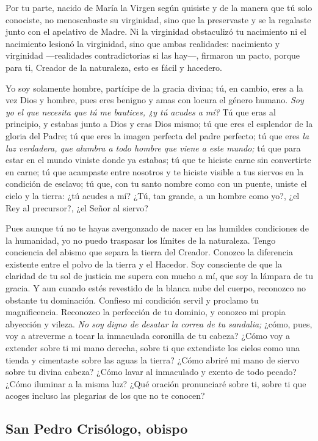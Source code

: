 \begin{body}
\begin{body}
{Por tu parte, nacido de María la Virgen según quisiste y de la manera que tú solo conociste, no menoscabaste su virginidad, sino que la preservaste y se la regalaste junto con el apelativo de Madre. Ni la virginidad obstaculizó tu nacimiento ni el nacimiento lesionó la virginidad, sino que ambas realidades: nacimiento y virginidad ---realidades contradictorias si las hay---, firmaron un pacto, porque para ti, Creador de la naturaleza, esto es fácil y hacedero.

Yo soy solamente hombre, partícipe de la gracia divina; tú, en cambio, eres a la vez Dios y hombre, pues eres benigno y amas con locura el género humano. \emph{Soy yo el que necesita que tú me bautices, ¿y tú acudes a mí?} Tú que eras al principio, y estabas junto a Dios y eras Dios mismo; tú que eres el esplendor de la gloria del Padre; tú que eres la imagen perfecta del padre perfecto; tú que eres \emph{la luz verdadera, que alumbra a todo hombre que viene a este mundo;} tú que para estar en el mundo viniste donde ya estabas; tú que te hiciste carne sin convertirte en carne; tú que acampaste entre nosotros y te hiciste visible a tus siervos en la condición de esclavo; tú que, con tu santo nombre como con un puente, uniste el cielo y la tierra: ¿tú acudes a mí? ¿Tú, tan grande, a un hombre como yo?, ¿el Rey al precursor?, ¿el Señor al siervo?

Pues aunque tú no te hayas avergonzado de nacer en las humildes condiciones de la humanidad, yo no puedo traspasar los límites de la naturaleza. Tengo conciencia del abismo que separa la tierra del Creador. Conozco la diferencia existente entre el polvo de la tierra y el Hacedor. Soy consciente de que la claridad de tu sol de justicia me supera con mucho a mí, que soy la lámpara de tu gracia. Y aun cuando estés revestido de la blanca nube del cuerpo, reconozco no obstante tu dominación. Confieso mi condición servil y proclamo tu magnificencia. Reconozco la perfección de tu dominio, y conozco mi propia abyección y vileza. \emph{No soy digno de desatar la correa de tu sandalia;} ¿cómo, pues, voy a atreverme a tocar la inmaculada coronilla de tu cabeza? ¿Cómo voy a extender sobre ti mi mano derecha, sobre ti que extendiste los cielos como una tienda y cimentaste sobre las aguas la tierra? ¿Cómo abriré mi mano de siervo sobre tu divina cabeza? ¿Cómo lavar al inmaculado y exento de todo pecado? ¿Cómo iluminar a la misma luz? ¿Qué oración pronunciaré sobre ti, sobre ti que acoges incluso las plegarias de los que no te conocen?

\subsection{San Pedro Crisólogo, obispo}

}
\end{body}
\end{body}
